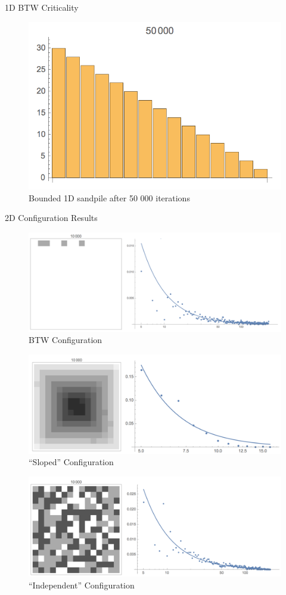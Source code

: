 \documentclass[final]{beamer}
\newlength{\onecolwid}
\begin{document}
\begin{frame}[t]
\begin{columns}[t]
\begin{column}{\onecolwid}
\begin{block}{1D BTW Criticality}
\begin{figure}
\includegraphics[width=0.4\linewidth]{1D.jpg}
\caption{Bounded 1D sandpile after 50 000 iterations}
\end{figure}
\end{block}



\begin{block}{2D Configuration Results}

\begin{figure}
\includegraphics[width=0.8\linewidth]{2D-btw.jpg}
\caption{BTW Configuration}
\end{figure}

\begin{figure}
\includegraphics[width=0.8\linewidth]{2D-sloped.jpg}
\caption{``Sloped'' Configuration}
\end{figure}

\begin{figure}
\includegraphics[width=0.8\linewidth]{2D-indep.jpg}
\caption{``Independent'' Configuration}
\end{figure}


\end{block}
\end{column}
\end{columns}
\end{frame}
\end{document}
